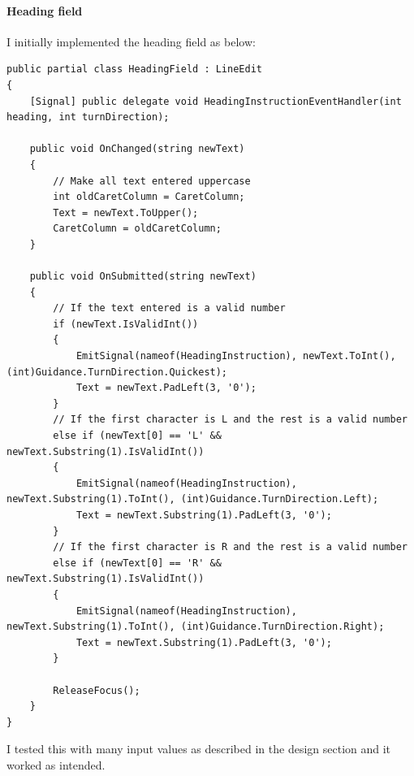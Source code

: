 \documentclass{article}
\begin{document}
\paragraph{Heading field}
I initially implemented the heading field as below:
\lstset{style=csharp}
\begin{lstlisting}[caption=Heading field script]
public partial class HeadingField : LineEdit
{
    [Signal] public delegate void HeadingInstructionEventHandler(int heading, int turnDirection);

    public void OnChanged(string newText)
    {
        // Make all text entered uppercase
        int oldCaretColumn = CaretColumn;
        Text = newText.ToUpper();
        CaretColumn = oldCaretColumn;
    }

    public void OnSubmitted(string newText) 
    {
        // If the text entered is a valid number
        if (newText.IsValidInt())
        {
            EmitSignal(nameof(HeadingInstruction), newText.ToInt(), (int)Guidance.TurnDirection.Quickest);
            Text = newText.PadLeft(3, '0');
        }
        // If the first character is L and the rest is a valid number
        else if (newText[0] == 'L' && newText.Substring(1).IsValidInt())
        {
            EmitSignal(nameof(HeadingInstruction), newText.Substring(1).ToInt(), (int)Guidance.TurnDirection.Left);
            Text = newText.Substring(1).PadLeft(3, '0');
        }
        // If the first character is R and the rest is a valid number
        else if (newText[0] == 'R' && newText.Substring(1).IsValidInt())
        {
            EmitSignal(nameof(HeadingInstruction), newText.Substring(1).ToInt(), (int)Guidance.TurnDirection.Right);
            Text = newText.Substring(1).PadLeft(3, '0');
        }

        ReleaseFocus();
    }
}
\end{lstlisting}
I tested this with many input values as described in the design section and it worked as intended.
\end{document}
